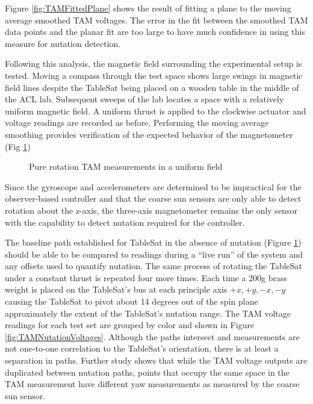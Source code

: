 Figure \ref{fig:TAMFittedPlane} shows the result of fitting a plane to the moving average smoothed TAM voltages.  The error in the fit between the smoothed TAM data points and the planar fit are too large to have much confidence in using this measure for nutation detection.

Following this analysis, the magnetic field surrounding the experimental setup is tested.  Moving a compass through the test space shows large swings in magnetic field lines despite the TableSat being placed on a wooden table in the middle of the ACL lab.  Subsequent sweeps of the lab locates a space with a relatively uniform magnetic field.  A uniform thrust is applied to the clockwise actuator and voltage readings are recorded as before.  Performing the moving average smoothing provides verification of the expected behavior of the magnetometer (Fig \ref{fig:TAMUniformField})

\begin{figure}[H]
  \centerline{}
  \caption{Pure rotation TAM measurements in a uniform field}
  \label{fig:TAMUniformField}
\end{figure}

Since the gyroscope and accelerometers are determined to be impractical for the observer-based controller and that the coarse sun sensors are only able to detect rotation about the z-axis, the three-axis magnetometer remains the only sensor with the capability to detect nutation required for the controller.

The baseline path established for TableSat in the absence of nutation (Figure \ref{fig:TAMUniformField}) should be able to be compared to readings during a ``live run'' of the system and any offsets used to quantify nutation.  The same process of rotating the TableSat under a constant thrust is repeated four more times.  Each time a 200g brass weight is placed on the TableSat's bus at each principle axis $+x, +y, -x, -y$ causing the TableSat to pivot about 14 degrees out of the spin plane approximately the extent of the TableSat's nutation range.  The TAM voltage readings for each test set are grouped by color and shown in Figure \ref{fig:TAMNutationVoltages}.  Although the paths intersect and measurements are not one-to-one correlation to the TableSat's orientation, there is at least a separation in paths.  Further study shows that while the TAM voltage outputs are duplicated between nutation paths, points that occupy the same space in the TAM measurement have different yaw measurements as measured by the coarse sun sensor.

